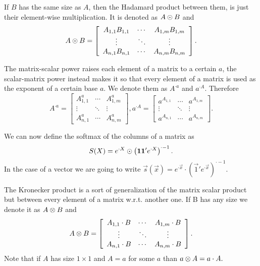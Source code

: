 \documentclass{sapthesis}
\begin{document}
If \(B\) has the same size as \(A\), then the Hadamard product between them, is
just their element-wise multiplication. It is denoted as \(A \odot B\) and \[
A \odot B = \left[\begin{array}{ccc}
    A_{1,1} B_{1,1} & \cdots & A_{1,m} B_{1,m} \\
    \vdots & \ddots & \vdots \\
    A_{n,1} B_{n,1} & \cdots & A_{n,m} B_{n,m}
\end{array}\right].\]

The matrix-scalar power raises each element of a matrix to a certain \(a\), the
scalar-matrix power instead makes it so that every element of a matrix is used as
the exponent of a certain base \(a\). We denote them as \(A^{{\cdot}a}\) and
\(a^{{\cdot}A}.\) Therefore \[
    A^{{\cdot}a} =
    \left[\begin{array}{ccc}
        A_{1,1}^a & \cdots & A_{1,m}^a \\
        \vdots & \ddots & \vdots \\
        A_{n,1}^a & \cdots & A_{n,m}^a
    \end{array}\right],
    a^{{\cdot}A} =
    \left[\begin{array}{ccc}
        a^{A_{1,1}} & \cdots & a^{A_{1,m}} \\
        \vdots & \ddots & \vdots \\
        a^{A_{n,1}} & \cdots & a^{A_{n,m}}
    \end{array}\right].
\]

We can now define the softmax of the columns of a matrix as \[S(X) =
e^{{\cdot}X} \odot \left(\mathbf{1} \mathbf{1}' e^{{\cdot}X}\right)^{{\cdot}-1}.\] In
the case of a vector we are going to write \(\vec s(\vec x) = e^{{\cdot}\vec x}
\cdot (\vec 1' e^{{\cdot}\vec x})^{{\cdot}-1}.\)

The Kronecker product is a sort of generalization of the matrix scalar product
but between every element of a matrix w.r.t. another one. If B has any size we
denote it as \(A \otimes B\) and \[
    A \otimes B = \left[\begin{array}{ccc}
        A_{1,1} \cdot B & \cdots & A_{1,m} \cdot B \\
        \vdots & \ddots & \vdots \\
        A_{n,1} \cdot B & \cdots & A_{n,m} \cdot B
    \end{array}\right].\]
Note that if \(A\) has size \(1 \times 1\) and \(A = a\) for some \(a\) than \(a
\otimes A = a \cdot A.\)
\end{document}
